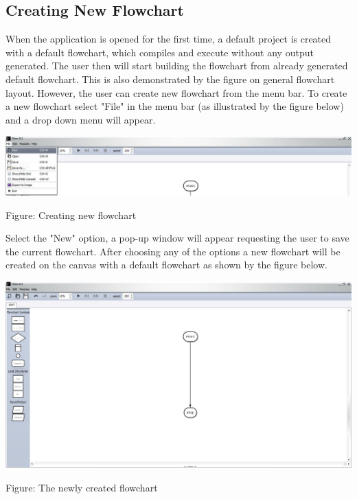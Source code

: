 \documentclass[11pt,a4paper,titlepage]{article}
\begin{document}
	\subsection{Creating New Flowchart}
	
	When the application is opened for the first time, a default project is created with a default flowchart, which compiles and execute without any output generated. The user then will start building the flowchart from already generated default flowchart. This is also demonstrated by the figure on general flowchart layout. \newline\newline
However, the user can create new flowchart from the menu bar. To create a new flowchart select "File" in the menu bar (as illustrated by the figure below) and a drop down menu will appear.\newline \newline

		\includegraphics[width=14cm]{images/Menu.jpg}
		\begin{center}
			Figure: Creating new flowchart \newline \newline
		\end{center}

 Select the "New" option, a pop-up window will appear requesting the user to save the current flowchart. After choosing any of the options a new flowchart will be created on the canvas with a default flowchart as shown by the figure below.\newline \newline
 
 		\includegraphics[width=14cm]{images/newFlowchart.jpg}
		\begin{center}
			Figure: The newly created flowchart\newline \newline
		\end{center}
		
\end{document}
